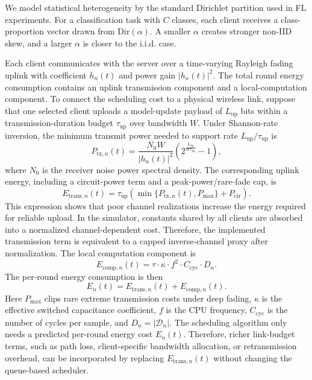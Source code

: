 \documentclass[journal]{IEEEtran}
\begin{document}
We model statistical heterogeneity by the standard Dirichlet partition used in FL experiments. For a classification task with $C$ classes, each client receives a class-proportion vector drawn from $\mathrm{Dir}(\alpha)$. A smaller $\alpha$ creates stronger non-IID skew, and a larger $\alpha$ is closer to the i.i.d. case.

Each client communicates with the server over a time-varying Rayleigh fading uplink with coefficient $h_n(t)$ and power gain $|h_n(t)|^2$. The total round energy consumption contains an uplink transmission component and a local-computation component. To connect the scheduling cost to a physical wireless link, suppose that one selected client uploads a model-update payload of $L_{\mathrm{up}}$ bits within a transmission-duration budget $\tau_{\mathrm{up}}$ over bandwidth $W$. Under Shannon-rate inversion, the minimum transmit power needed to support rate $L_{\mathrm{up}}/\tau_{\mathrm{up}}$ is
\begin{equation}
P_{\mathrm{tx},n}(t)
=
\frac{N_0 W}{|h_n(t)|^2}
\left(2^{\frac{L_{\mathrm{up}}}{W\tau_{\mathrm{up}}}}-1\right),
\end{equation}
where $N_0$ is the receiver noise power spectral density. The corresponding uplink energy, including a circuit-power term and a peak-power/rare-fade cap, is
\begin{equation}
E_{\text{trans},n}(t)
=
\tau_{\mathrm{up}}\left(
\min\{P_{\mathrm{tx},n}(t),P_{\max}\}
+P_{\mathrm{cir}}
\right).
\end{equation}
This expression shows that poor channel realizations increase the energy required for reliable upload. In the simulator, constants shared by all clients are absorbed into a normalized channel-dependent cost. Therefore, the implemented transmission term is equivalent to a capped inverse-channel proxy after normalization. The local computation component is
\begin{equation}
E_{\text{comp},n}(t)=\tau\cdot\kappa\cdot f^2\cdot C_{\text{cyc}}\cdot D_n.
\end{equation}
The per-round energy consumption is then
\begin{equation}
E_n(t)=E_{\text{trans},n}(t)+E_{\text{comp},n}(t).
\end{equation}
Here $P_{\max}$ clips rare extreme transmission costs under deep fading, $\kappa$ is the effective switched capacitance coefficient, $f$ is the CPU frequency, $C_{\text{cyc}}$ is the number of cycles per sample, and $D_n=|\mathcal{D}_n|$. The scheduling algorithm only needs a predicted per-round energy cost $E_n(t)$. Therefore, richer link-budget terms, such as path loss, client-specific bandwidth allocation, or retransmission overhead, can be incorporated by replacing $E_{\text{trans},n}(t)$ without changing the queue-based scheduler.
\end{document}
